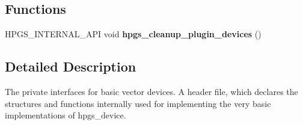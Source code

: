 \subsection*{Functions}
\begin{DoxyCompactItemize}
\item 
HPGS\_\-INTERNAL\_\-API void {\bfseries hpgs\_\-cleanup\_\-plugin\_\-devices} ()\label{group__device_gae99c6a46a83f5dc00f3e9cc3420356fb}

\end{DoxyCompactItemize}


\subsection{Detailed Description}
The private interfaces for basic vector devices. A header file, which declares the structures and functions internally used for implementing the very basic implementations of {\ttfamily hpgs\_\-device}. 